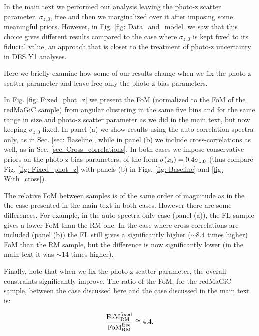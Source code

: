 \documentclass[a4paper,fleqn,usenatbib]{mnras}
\begin{document}
In the main text we performed our analysis leaving the photo-z scatter parameter, $\sigma_{z,0}$, free and then we marginalized over it after imposing some meaningful priors. 	However, in Fig. \ref{fig: Data_and_model} we saw that this choice gives different results compared to the case where $\sigma_{z,0}$ is kept fixed to its fiducial value, an approach that is closer to the treatment of photo-z uncertainty in DES Y1 analyses.

Here we briefly examine how some of our results change when we fix the photo-z scatter parameter and leave free only the photo-z bias parameters.

In Fig. \ref{fig: Fixed_phot_z} we present the  FoM  (normalized to the FoM of the redMaGiC sample) from angular clustering in the same five bins and for the same range in size and photo-z scatter parameter as we did in the main text, but now keeping $\sigma_{z,0}$ fixed. In panel (a) we show results using the auto-correlation spectra only, as in Sec. \ref{sec: Baseline}, while in panel (b) we include cross-correlations as well, as in Sec. \ref{sec: Cross_correlations}. In both cases we impose conservative priors  on the photo-z bias parameters, of the form $\sigma(z_{\mbox{\scriptsize{b}}}) = 0.4\sigma_{z,0}$ (thus compare Fig. \ref{fig: Fixed_phot_z} with panels (b) in Figs. \ref{fig: Baseline} and \ref{fig: With_cross}).

The relative FoM between samples is of the same order of magnitude as in the the case presented in the main text in both cases. However there are some differences. For example, in the auto-spectra only case (panel (a)), the FL sample gives a lower FoM than the RM one.  In the case where cross-correlations are included (panel (b)) the FL still gives a significantly higher ($\sim 8.4$ times higher) FoM than the RM sample, but the difference is now significantly lower (in the main text it was $\sim 14 $ times higher).

Finally, note that when we fix the photo-z scatter parameter, the overall constraints significantly improve. The ratio of the FoM, for the redMaGiC sample, between the case discussed here and the case discussed in the main text is:

\begin{equation}
\frac{\mbox{FoM}_{\mbox{\scriptsize{RM}}}^{\mbox{\scriptsize{fixed}}}}{\mbox{FoM}_{\mbox{\scriptsize{RM}}}^{\mbox{\scriptsize{free}}}} \cong 4.4.
\end{equation}
\end{document}
